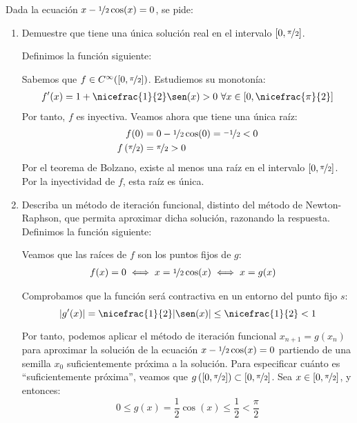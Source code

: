 \begin{ejercicio}\label{ej:1.1.5}
    Dada la ecuación $x - \nicefrac{1}{2}\cos(x) = 0$, se pide:
    \begin{enumerate}
        \item Demuestre que tiene una única solución real en el intervalo $\left[0,\nicefrac{\pi}{2}\right]$.
        
        Definimos la función siguiente:

        Sabemos que $f\in C^{\infty}([0,\nicefrac{\pi}{2}])$. Estudiemos su monotonía:
        \begin{align*}
            f'(x)=1+\nicefrac{1}{2}\sen(x)>0\ \forall x\in[0,\nicefrac{\pi}{2}]
        \end{align*}
        Por tanto, $f$ es inyectiva. Veamos ahora que tiene una única raíz:
        \begin{align*}
            f(0)&=0-\nicefrac{1}{2}\cos(0)=\nicefrac{-1}{2}<0\\
            f\left(\nicefrac{\pi}{2}\right)&=\nicefrac{\pi}{2}>0
        \end{align*}
        Por el teorema de Bolzano, existe al menos una raíz en el intervalo $[0,\nicefrac{\pi}{2}]$. Por la inyectividad de $f$, esta raíz es única.
        
        \item\label{ej:1.1.5b}
        Describa un método de iteración funcional, distinto del método de Newton-Raphson, que permita aproximar dicha solución, razonando la respuesta.\\

        Definimos la función siguiente:

        Veamos que las raíces de $f$ son los puntos fijos de $g$:
        \begin{align*}
            f(x)=0&\iff x=\nicefrac{1}{2}\cos(x)\iff x=g(x)
        \end{align*}

        Comprobamos que la función será contractiva en un entorno del punto fijo $s$:
        \begin{equation*}
            |g'(x)|=\nicefrac{1}{2}|\sen(x)|\leq \nicefrac{1}{2}<1
        \end{equation*}

        Por tanto, podemos aplicar el método de iteración funcional $x_{n+1}=g(x_n)$ para aproximar la solución de la ecuación $x-\nicefrac{1}{2}\cos(x)=0$ partiendo de una semilla $x_0$ suficientemente próxima a la solución. Para especificar cuánto es ``suficientemente próxima'', veamos que $g\left([0,\nicefrac{\pi}{2}]\right)\subset [0,\nicefrac{\pi}{2}]$. Sea $x\in[0,\nicefrac{\pi}{2}]$, y entonces:
        \begin{equation*}
            0\leq g(x)=\frac{1}{2}\cos(x)\leq \frac{1}{2}<\frac{\pi}{2}
        \end{equation*}


\end{enumerate}
\end{ejercicio}
